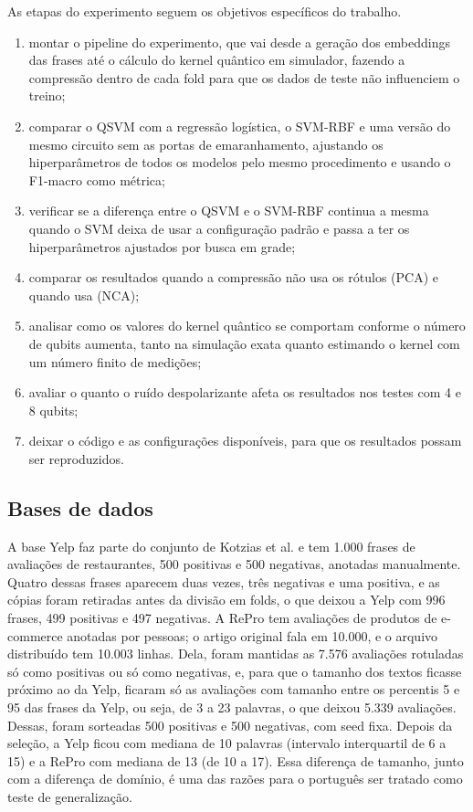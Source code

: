 \documentclass[conference]{IEEEtran}
\newcommand{\svm}{\mbox{SVM-RBF}}
\begin{document}
As etapas do experimento seguem os objetivos específicos do trabalho.
\begin{enumerate}
\item montar o pipeline do experimento, que vai desde a geração dos embeddings das frases até o cálculo do kernel quântico em simulador, fazendo a compressão dentro de cada fold para que os dados de teste não influenciem o treino;
\item comparar o QSVM com a regressão logística, o \svm{} e uma versão do mesmo circuito sem as portas de emaranhamento, ajustando os hiperparâmetros de todos os modelos pelo mesmo procedimento e usando o F1-macro como métrica;
\item verificar se a diferença entre o QSVM e o \svm{} continua a mesma quando o SVM deixa de usar a configuração padrão e passa a ter os hiperparâmetros ajustados por busca em grade;
\item comparar os resultados quando a compressão não usa os rótulos (PCA) e quando usa (NCA);
\item analisar como os valores do kernel quântico se comportam conforme o número de qubits aumenta, tanto na simulação exata quanto estimando o kernel com um número finito de medições;
\item avaliar o quanto o ruído despolarizante afeta os resultados nos testes com 4 e 8 qubits;
\item deixar o código e as configurações disponíveis, para que os resultados possam ser reproduzidos.
\end{enumerate}



\subsection{Bases de dados}
A base Yelp faz parte do conjunto de Kotzias et al. \cite{kotzias2015} e tem 1.000 frases de avaliações de restaurantes, 500 positivas e 500 negativas, anotadas manualmente. Quatro dessas frases aparecem duas vezes, três negativas e uma positiva, e as cópias foram retiradas antes da divisão em folds, o que deixou a Yelp com 996 frases, 499 positivas e 497 negativas. A RePro \cite{repro2024} tem avaliações de produtos de e-commerce anotadas por pessoas; o artigo original fala em 10.000, e o arquivo distribuído tem 10.003 linhas. Dela, foram mantidas as 7.576 avaliações rotuladas só como positivas ou só como negativas, e, para que o tamanho dos textos ficasse próximo ao da Yelp, ficaram só as avaliações com tamanho entre os percentis 5 e 95 das frases da Yelp, ou seja, de 3 a 23 palavras, o que deixou 5.339 avaliações. Dessas, foram sorteadas 500 positivas e 500 negativas, com seed fixa. Depois da seleção, a Yelp ficou com mediana de 10 palavras (intervalo interquartil de 6 a 15) e a RePro com mediana de 13 (de 10 a 17). Essa diferença de tamanho, junto com a diferença de domínio, é uma das razões para o português ser tratado como teste de generalização.
\end{document}
